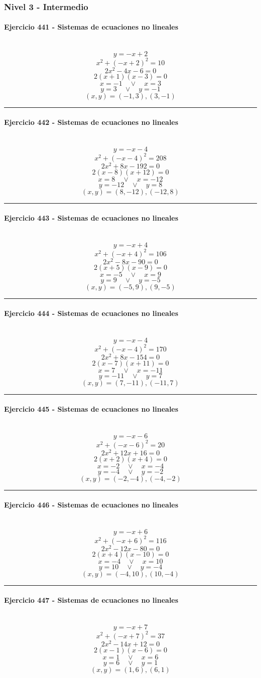 \documentclass[10pt,a4paper]{article}
\newcommand{\res}[1]{\paragraph{#1}\mbox{}\\[-1.2em]}
\begin{document}
\subsubsection*{Nivel 3 - Intermedio}
\res{Ejercicio 441 - Sistemas de ecuaciones no lineales}
\[ y=-x+2 \]
\[ x^2+(-x+2)^2=10 \]
\[ 2 x^{2} - 4 x - 6=0 \]
\[ 2(x+1)(x-3)=0 \]
\[ x=-1\quad \vee \quad x=3 \]
\[ y=3\quad \vee \quad y=-1 \]
\[ \boxed{(x,y)=(-1,3),(3,-1)} \]
\vspace{1mm}\hrule\vspace{2mm}
\res{Ejercicio 442 - Sistemas de ecuaciones no lineales}
\[ y=-x-4 \]
\[ x^2+(-x-4)^2=208 \]
\[ 2 x^{2} + 8 x - 192=0 \]
\[ 2(x-8)(x+12)=0 \]
\[ x=8\quad \vee \quad x=-12 \]
\[ y=-12\quad \vee \quad y=8 \]
\[ \boxed{(x,y)=(8,-12),(-12,8)} \]
\vspace{1mm}\hrule\vspace{2mm}
\res{Ejercicio 443 - Sistemas de ecuaciones no lineales}
\[ y=-x+4 \]
\[ x^2+(-x+4)^2=106 \]
\[ 2 x^{2} - 8 x - 90=0 \]
\[ 2(x+5)(x-9)=0 \]
\[ x=-5\quad \vee \quad x=9 \]
\[ y=9\quad \vee \quad y=-5 \]
\[ \boxed{(x,y)=(-5,9),(9,-5)} \]
\vspace{1mm}\hrule\vspace{2mm}
\res{Ejercicio 444 - Sistemas de ecuaciones no lineales}
\[ y=-x-4 \]
\[ x^2+(-x-4)^2=170 \]
\[ 2 x^{2} + 8 x - 154=0 \]
\[ 2(x-7)(x+11)=0 \]
\[ x=7\quad \vee \quad x=-11 \]
\[ y=-11\quad \vee \quad y=7 \]
\[ \boxed{(x,y)=(7,-11),(-11,7)} \]
\vspace{1mm}\hrule\vspace{2mm}
\res{Ejercicio 445 - Sistemas de ecuaciones no lineales}
\[ y=-x-6 \]
\[ x^2+(-x-6)^2=20 \]
\[ 2 x^{2} + 12 x + 16=0 \]
\[ 2(x+2)(x+4)=0 \]
\[ x=-2\quad \vee \quad x=-4 \]
\[ y=-4\quad \vee \quad y=-2 \]
\[ \boxed{(x,y)=(-2,-4),(-4,-2)} \]
\vspace{1mm}\hrule\vspace{2mm}
\res{Ejercicio 446 - Sistemas de ecuaciones no lineales}
\[ y=-x+6 \]
\[ x^2+(-x+6)^2=116 \]
\[ 2 x^{2} - 12 x - 80=0 \]
\[ 2(x+4)(x-10)=0 \]
\[ x=-4\quad \vee \quad x=10 \]
\[ y=10\quad \vee \quad y=-4 \]
\[ \boxed{(x,y)=(-4,10),(10,-4)} \]
\vspace{1mm}\hrule\vspace{2mm}
\res{Ejercicio 447 - Sistemas de ecuaciones no lineales}
\[ y=-x+7 \]
\[ x^2+(-x+7)^2=37 \]
\[ 2 x^{2} - 14 x + 12=0 \]
\[ 2(x-1)(x-6)=0 \]
\[ x=1\quad \vee \quad x=6 \]
\[ y=6\quad \vee \quad y=1 \]
\[ \boxed{(x,y)=(1,6),(6,1)} \]
\end{document}
